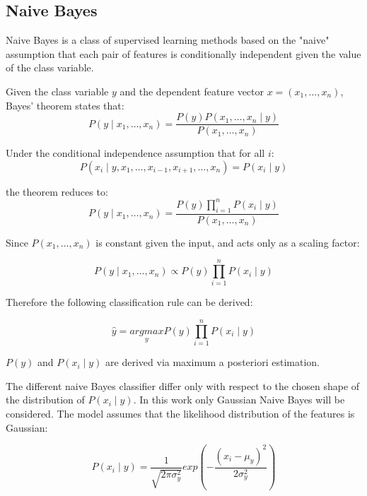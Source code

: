 \documentclass[journal,twocolumn]{IEEEtran}
\begin{document}
\subsection{Naive Bayes}

Naive Bayes is a class of supervised learning methods based on the "naive" assumption that each pair of features is conditionally independent given the value of the class variable.

Given the class variable $y$ and the dependent feature vector $x=(x_1,\dots,x_n)$, Bayes' theorem states that:
\begin{equation}
P(y\mid x_1,\dots, x_n)=\frac{P(y)P(x_1,\dots,x_n\mid y)}{P(x_1,\dots,x_n)}
\end{equation}

Under the conditional independence assumption that for all $i$:
\begin{equation*}
P(x_i\mid y,x_1,\dots,x_{i-1},x_{i+1},\dots, x_n)=P(x_i\mid y)
\end{equation*}

the theorem reduces to:
\begin{equation*}
P(y\mid x_1,\dots, x_n)=\frac{P(y)\prod\limits_{i=1}^nP(x_i\mid y)}{P(x_1,\dots,x_n)}
\end{equation*}

Since $P(x_1,\dots,x_n)$ is constant given the input, and acts only as a scaling factor:

\begin{equation*}
P(y\mid x_1,\dots, x_n)\propto P(y)\prod\limits_{i=1}^nP(x_i\mid y)
\end{equation*}

Therefore the following classification rule can be derived:

\begin{equation*}
\hat y = \underset{y}{argmax}P(y)\prod\limits_{i=1}^nP(x_i\mid y)
\end{equation*}

$P(y)$ and $P(x_i\mid y)$ are derived via maximum a posteriori estimation.

The different naive Bayes classifier differ only with respect to the chosen shape of the distribution of $P(x_i\mid y)$. In this work only Gaussian Naive Bayes will be considered. The model assumes that the likelihood distribution of the features is Gaussian:

\begin{equation*}
P(x_i\mid y)=\frac{1}{\sqrt{2\pi\sigma_y^2}}exp\left(-\frac{(x_i-\mu_y)^2}{2\sigma_y^2}\right)
\end{equation*}
\end{document}
